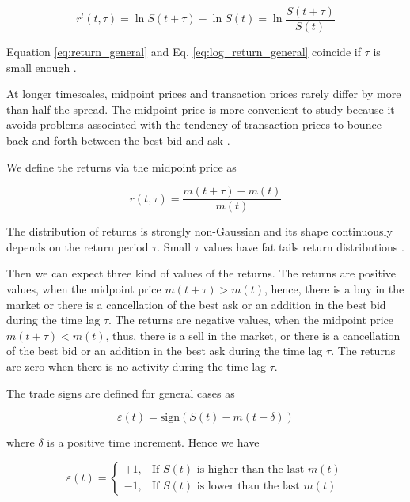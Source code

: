 \begin{equation}\label{eq:log_return_general}
    r^{l}\left(t,\tau\right) = \ln S\left(t + \tau\right)
    - \ln S\left(t\right) = \ln \frac{S\left(t + \tau\right)}{S\left(t\right)}
\end{equation}

Equation \ref{eq:return_general} and Eq. \ref{eq:log_return_general} coincide
if $\tau$ is small enough \cite{subtle_nature,empirical_facts}.

At longer timescales, midpoint prices and transaction prices rarely differ by
more than half the spread. The midpoint price is more convenient to study
because it avoids problems associated with the tendency of transaction prices
to bounce back and forth between the best bid and ask
\cite{large_prices_changes}.

We define the returns via the midpoint price as

\begin{equation}\label{eq:midpoint_price_return}
    r\left(t,\tau\right) = \frac{m\left(t+\tau\right)-m\left(t\right)}
    {m\left(t\right)}
\end{equation}

The distribution of returns is strongly non-Gaussian and its shape continuously
depends on the return period $\tau$. Small $\tau$ values have fat tails return
distributions \cite{subtle_nature}.

Then we can expect three kind of values of the returns. The returns are
positive values, when the midpoint price
$m\left(t+\tau\right) > m\left(t\right)$, hence, there is a buy in the market
or there is a cancellation of the best ask or an addition in the best bid
during the time lag $\tau$. The returns are negative values, when the midpoint
price $m\left(t+\tau\right) < m\left(t\right)$, thus, there is a sell in the
market, or there is a cancellation of the best bid or an addition in the best
ask during the time lag $\tau$. The returns are zero when there is no activity
during the time lag $\tau$.

The trade signs are defined for general cases as

\begin{equation}\label{eq:trade_sign_general}
    \varepsilon\left(t\right)=\text{sign}\left(S\left(t\right)
    -m\left(t-\delta\right)\right)
\end{equation}

where $\delta$ is a positive time increment. Hence we have

\begin{equation}\label{eq:trade_sign_results}
    \varepsilon\left(t\right)=\left\{
    \begin{array}{cc}
    +1, & \text{If } S\left(t\right)
    \text{ is higher than the last } m\left( t \right)\\
    -1, & \text{If } S\left(t\right)
    \text{ is lower than the last } m\left( t \right)
    \end{array}\right.
\end{equation}

